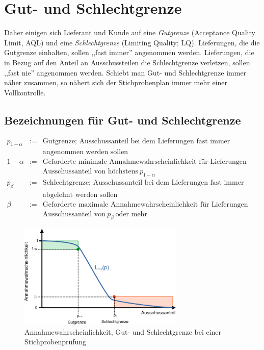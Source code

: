 \documentclass[a4paper,11pt,oneside]{article}
\begin{document}
\section{Gut- und Schlechtgrenze}

Daher einigen sich Lieferant und Kunde auf eine \emph{Gutgrenze} (Acceptance Quality Limit, AQL) und eine \emph{Schlechtgrenze} (Limiting Quality; LQ). Lieferungen, die die Gutgrenze einhalten, sollen ,,fast immer'' angenommen werden. Lieferungen, die in Bezug auf den Anteil an Ausschussteilen die Schlechtgrenze verletzen, sollen ,,fast nie'' angenommen werden. Schiebt man Gut- und Schlechtgrenze immer näher zusammen, so nähert sich der Stichprobenplan immer mehr einer Vollkontrolle.

\subsection*{Bezeichnungen für Gut- und Schlechtgrenze}

\begin{eqnarray*}
p_{1-\alpha}&:=&\text{Gutgrenze; Ausschussanteil bei dem Lieferungen fast immer}\\
~&~&\text{angenommen werden sollen}\\[2ex]
1-\alpha&:=&\text{Geforderte minimale Annahmewahrscheinlichkeit für Lieferungen mit einem}\\
~&~&\text{Ausschussanteil von höchstens}~ p_{1-\alpha}\\[2ex]
p_\beta&:=&\text{Schlechtgrenze; Ausschussanteil bei dem Lieferungen fast immer}\\
~&~&\text{abgelehnt werden sollen}\\[2ex]
\beta&:=&\text{Geforderte maximale Annahmewahrscheinlichkeit für Lieferungen mit einem}\\
~&~&\text{Ausschussanteil von}~ p_{\beta} ~\text{oder mehr}
\end{eqnarray*}

\begin{figure}[H]
\begin{center}
\includegraphics[width=0.7\textwidth]{Operationscharakteristik.pdf}
\end{center}
\caption{Annahmewahrscheinlichkeit, Gut- und Schlechtgrenze bei einer Stichprobenprüfung}
\label{fig:L}
\end{figure}
\end{document}
